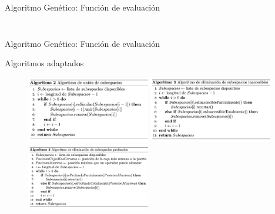 \documentclass[handout]{beamer}
\begin{document}
\begin{frame}{Algoritmo Genético: Función de evaluación}
\begin{columns}
\begin{column}{0.5\textwidth}
\begin{overlayarea}{\textwidth}{\textheight}
{\begin{figure}
                    \end{figure}
                }
            \end{overlayarea}
        \end{column}
    \end{columns}
\end{frame}

\begin{frame}{Algoritmo Genético: Función de evaluación}
    \begin{exampleblock}{Algoritmos adaptados}
        \begin{figure}
            \centering
            \includegraphics[width=0.48\textwidth]{pic/union-subespacios.png}
            \includegraphics[width=0.48\textwidth]{pic/subespacios-inaccesibles.png}
            \includegraphics[width=0.48\textwidth]{pic/subespacios-profundos.png}
        \end{figure}
    \end{exampleblock}
\end{frame}
\end{document}
